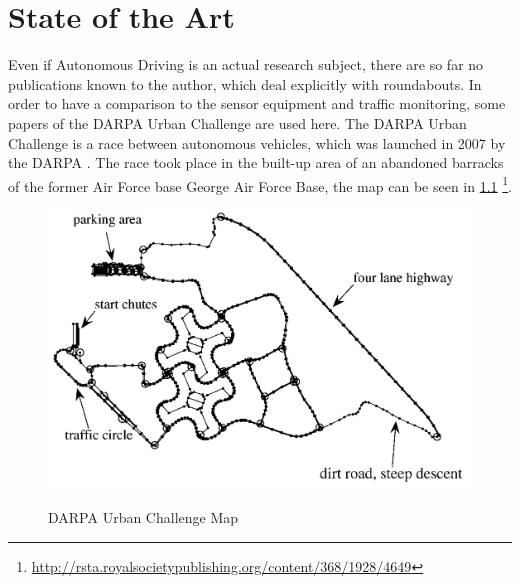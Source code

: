 \documentclass[11pt,oneside,openright]{mpreport}
\begin{document}
\chapter{State of the Art}
Even if Autonomous Driving is an actual research subject, there are so far no publications known to the author, which deal explicitly with roundabouts.
In order to have a comparison to the sensor equipment and traffic monitoring, some papers of the \acs{DARPA} Urban Challenge are used here. 
The DARPA Urban Challenge is a race between autonomous vehicles, which was launched in 2007 by the \ac{DARPA} \cite {Buehler2010}.
The race took place in the built-up area of an abandoned barracks of the former Air Force base George Air Force Base, the map can be seen in \cref{darpa_map}
\footnote{\url{http://rsta.royalsocietypublishing.org/content/368/1928/4649}}.

\begin{figure}[!ht]
\caption{ \acs{DARPA} Urban Challenge Map }
\includegraphics[width=\textwidth]{bilder/darpa_map_bw.png}
\label{darpa_map}
\end{figure}
\end{document}
